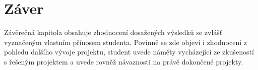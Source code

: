 \chapter{Záver}\label{ch:kap6}
Závěrečná kapitola obsahuje zhodnocení dosažených výsledků se zvlášť vyznačeným vlastním přínosem studenta. Povinně se zde objeví i zhodnocení z pohledu dalšího vývoje projektu, student uvede náměty vycházející ze zkušeností s řešeným projektem a uvede rovněž návaznosti na právě dokončené projekty.


